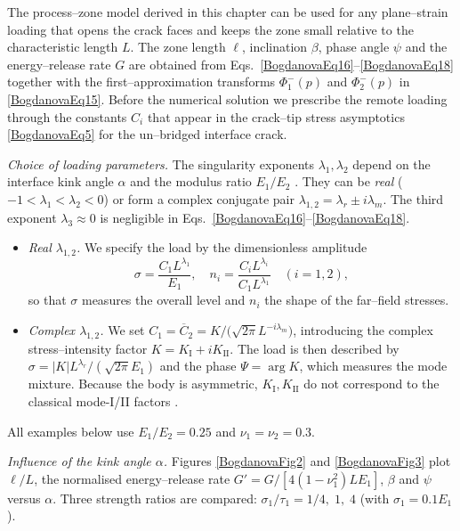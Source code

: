The process–zone model derived in this chapter
can be used for any plane–strain loading that opens the crack faces
and keeps the zone small relative to the characteristic length \(L\).
The zone length \(\ell\), inclination \(\beta\),
phase angle \(\psi\) and the energy–release rate \(G\) are obtained from
Eqs.~\eqref{BogdanovaEq16}–\eqref{BogdanovaEq18}
together with the first–approximation transforms
\(\Phi_1^{-}(p)\) and \(\Phi_2^{-}(p)\) in \eqref{BogdanovaEq15}.
Before the numerical solution we prescribe the remote loading
through the constants \(C_i\) that appear in the crack–tip stress
asymptotics \eqref{BogdanovaEq5} for the un–bridged interface crack.

\medskip\emph{Choice of loading parameters.} The singularity exponents \(\lambda_1,\lambda_2\)
depend on the interface kink angle \(\alpha\)
and the modulus ratio \(E_1/E_2\) \cite{Bogdanova15}.
They can be \emph{real} (\(-1<\lambda_1<\lambda_2<0\))
or form a complex conjugate pair
\(\lambda_{1,2}= \lambda_r \pm i\lambda_m\).
The third exponent \(\lambda_3\approx 0\) is negligible in Eqs.~\eqref{BogdanovaEq16}–\eqref{BogdanovaEq18}.

\begin{itemize}
	\item
	\emph{Real \(\lambda_{1,2}\).}\;
	We specify the load by the dimensionless amplitude
	\[
	\sigma=\frac{C_1 L^{\lambda_1}}{E_1},
	\quad
	n_i=\frac{C_i L^{\lambda_i}}{C_1 L^{\lambda_1}}
	\quad(i=1,2),
	\]
	so that \(\sigma\) measures the overall level
	and \(n_i\) the shape of the far–field stresses.
	
	\item
	\emph{Complex \(\lambda_{1,2}\).}\;
	We set \(C_1=\overline{C}_2
	=K/\bigl(\sqrt{2\pi} L^{-i\lambda_m}\bigr)\),
	introducing the complex stress–intensity factor
	\(K=K_{\mathrm I}+iK_{\mathrm{II}}\).
	The load is then described by
	\(\sigma=|K|L^{\lambda_r}/(\sqrt{2\pi} E_1)\)
	and the phase \(\Psi=\arg K\),
	which measures the mode mixture.
	Because the body is asymmetric,
	\(K_{\mathrm I},K_{\mathrm{II}}\) do not correspond
	to the classical mode-I/II factors \cite{Bogdanova35}.
\end{itemize}

All examples below use \(E_1/E_2=0.25\) and \(\nu_1=\nu_2=0.3\).

\medskip\emph{Influence of the kink angle \(\alpha\).} Figures \ref{BogdanovaFig2} and \ref{BogdanovaFig3} plot
\(\ell/L\), the normalised energy–release rate
\(G'=G/[4(1-\nu_1^{2}) L E_1]\),
\(\beta\) and \(\psi\) versus \(\alpha\).
Three strength ratios are compared:
\(\sigma_1/\tau_1=1/4,\;1,\;4\)
(with \(\sigma_1=0.1 E_1\)).

